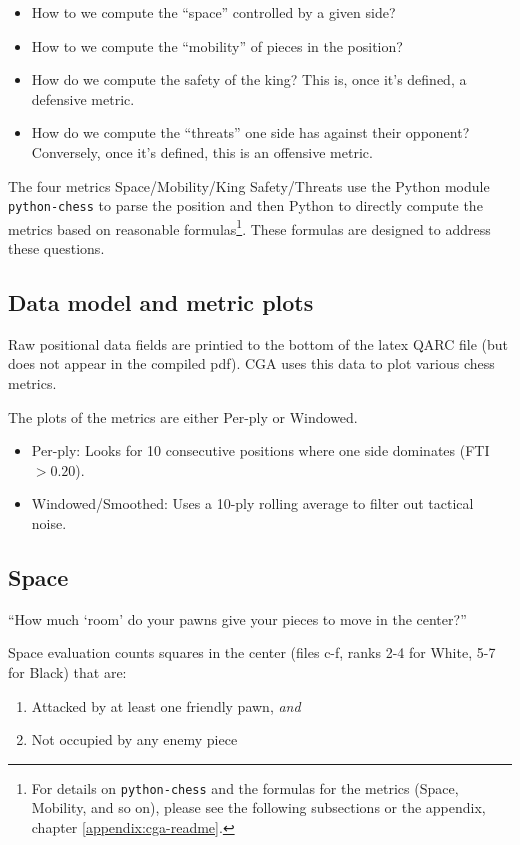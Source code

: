 \documentclass[12pt]{book}
\begin{document}
\begin{itemize}
\item
How to we compute the ``space'' controlled by a given side?

\item
How to we compute the ``mobility'' of pieces in the position?

\item
How do we compute the safety of the king?
This is, once it's defined, a defensive metric.

\item
How do we compute the ``threats'' one side has against their opponent?
Conversely, once it's defined, this is an offensive metric.
\end{itemize}

The four metrics
Space/Mobility/King Safety/Threats use the Python module
{\tt python-chess} to parse the position and then Python to directly
compute the metrics based on reasonable
formulas\footnote{For details on {\tt python-chess} and the
formulas for the metrics (Space, Mobility, and so on),
please see the following subsections or the
appendix, chapter \ref{appendix:cga-readme}.}.
These formulas are designed to address these questions.

\subsection{Data model and metric plots}

Raw positional data fields are printied to the bottom of
the latex QARC file (but does not appear in the
compiled pdf). CGA uses this data to plot various chess metrics.

The plots of the metrics are either Per-ply or Windowed.

\begin{itemize}
\item
Per-ply: Looks for 10 consecutive positions where one side dominates
(FTI $> 0.20$). 
\item
Windowed/Smoothed: Uses a 10-ply rolling average to filter out tactical noise.
\end{itemize}

\subsection{Space}

``How much `room' do your pawns give your pieces to move in the center?''

Space evaluation counts squares in the center (files c-f, ranks 2-4 for White, 5-7 for Black) that are:
\begin{enumerate}
\item Attacked by at least one friendly pawn, {\it and}
\item Not occupied by any enemy piece
\end{enumerate}
\end{document}
